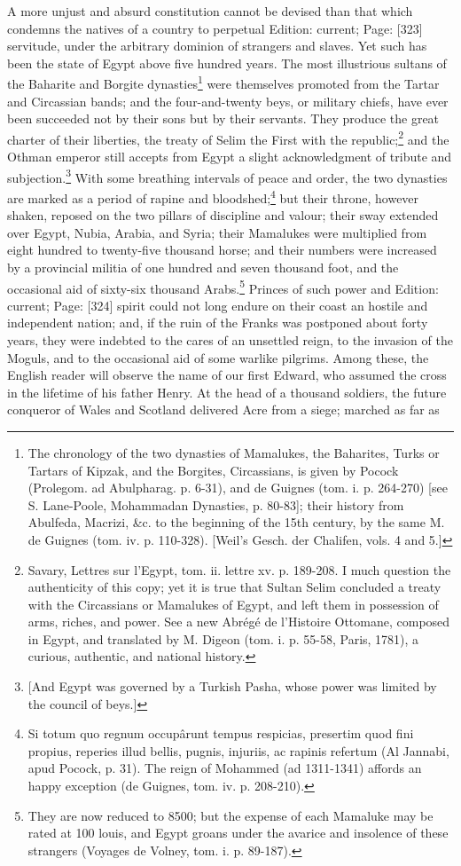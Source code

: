 A more unjust and absurd constitution cannot be devised than that which condemns the natives of a country to perpetual Edition: current; Page: [323] servitude, under the arbitrary dominion of strangers and slaves. Yet such has been the state of Egypt above five hundred years. The most illustrious sultans of the Baharite and Borgite dynasties\footnote{The chronology of the two dynasties of Mamalukes, the Baharites, Turks or Tartars of Kipzak, and the Borgites, Circassians, is given by Pocock (Prolegom. ad Abulpharag. p. 6-31), and de Guignes (tom. i. p. 264-270) [see S. Lane-Poole, Mohammadan Dynasties, p. 80-83]; their history from Abulfeda, Macrizi, \&c. to the beginning of the 15th century, by the same M. de Guignes (tom. iv. p. 110-328). [Weil\texthebrew{}’s Gesch. der Chalifen, vols. 4 and 5.]} were themselves promoted from the Tartar and Circassian bands; and the four-and-twenty beys, or military chiefs, have ever been succeeded not by their sons but by their servants. They produce the great charter of their liberties, the treaty of Selim the First with the republic;\footnote{Savary, Lettres sur l\texthebrew{}’Egypt, tom. ii. lettre xv. p. 189-208. I much question the authenticity of this copy; yet it is true that Sultan Selim concluded a treaty with the Circassians or Mamalukes of Egypt, and left them in possession of arms, riches, and power. See a new Abrégé de l\texthebrew{}’Histoire Ottomane, composed in Egypt, and translated by M. Digeon (tom. i. p. 55-58, Paris, 1781), a curious, authentic, and national history.} and the Othman emperor still accepts from Egypt a slight acknowledgment of tribute and subjection.\footnote{[And Egypt was governed by a Turkish Pasha, whose power was limited by the council of beys.]} With some breathing intervals of peace and order, the two dynasties are marked as a period of rapine and bloodshed;\footnote{Si totum quo regnum occupârunt tempus respicias, presertim quod fini propius, reperies illud bellis, pugnis, injuriis, ac rapinis refertum (Al Jannabi, apud Pocock, p. 31). The reign of Mohammed (ad 1311-1341) affords an happy exception (de Guignes, tom. iv. p. 208-210).} but their throne, however shaken, reposed on the two pillars of discipline and valour; their sway extended over Egypt, Nubia, Arabia, and Syria; their Mamalukes were multiplied from eight hundred to twenty-five thousand horse; and their numbers were increased by a provincial militia of one hundred and seven thousand foot, and the occasional aid of sixty-six thousand Arabs.\footnote{They are now reduced to 8500; but the expense of each Mamaluke may be rated at 100 louis, and Egypt groans under the avarice and insolence of these strangers (Voyages de Volney, tom. i. p. 89-187).} Princes of such power and Edition: current; Page: [324] spirit could not long endure on their coast an hostile and independent nation; and, if the ruin of the Franks was postponed about forty years, they were indebted to the cares of an unsettled reign, to the invasion of the Moguls, and to the occasional aid of some warlike pilgrims. Among these, the English reader will observe the name of our first Edward, who assumed the cross in the lifetime of his father Henry. At the head of a thousand soldiers, the future conqueror of Wales and Scotland delivered Acre from a siege; marched as far as 